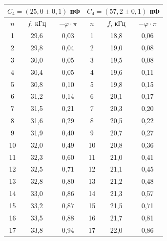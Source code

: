 \documentclass[a4paper, 12pt]{article}%
\begin{document}
\begin{center}
\begin{tabular}{ccc||c|c|c|}
\hline
\multicolumn{3}{|c||}{$C_4 = (25,0 \pm 0,1)$ нФ} & \multicolumn{3}{c|}{$C_4 = (57,2 \pm 0,1)$ нФ} \\ \hline
\multicolumn{1}{|c|}{$n$} & \multicolumn{1}{c|}{$f$, кГц} & $-\varphi\cdot \pi$ & $n$ & $f$, кГц & $-\varphi\cdot \pi$ \\ \hline
\multicolumn{1}{|c|}{1} & \multicolumn{1}{c|}{29,6} & 0,03 & 1 & 18,8 & 0,06 \\ \hline
\multicolumn{1}{|c|}{2} & \multicolumn{1}{c|}{29,8} & 0,04 & 2 & 19,0 & 0,08 \\ \hline
\multicolumn{1}{|c|}{3} & \multicolumn{1}{c|}{30,0} & 0,05 & 3 & 19,5 & 0,08 \\ \hline
\multicolumn{1}{|c|}{4} & \multicolumn{1}{c|}{30,4} & 0,05 & 4 & 19,6 & 0,11 \\ \hline
\multicolumn{1}{|c|}{5} & \multicolumn{1}{c|}{30,8} & 0,10 & 5 & 19,8 & 0,15 \\ \hline
\multicolumn{1}{|c|}{6} & \multicolumn{1}{c|}{31,2} & 0,14 & 6 & 20,1 & 0,17 \\ \hline
\multicolumn{1}{|c|}{7} & \multicolumn{1}{c|}{31,5} & 0,21 & 7 & 20,3 & 0,20 \\ \hline
\multicolumn{1}{|c|}{8} & \multicolumn{1}{c|}{31,6} & 0,29 & 8 & 20,5 & 0,22 \\ \hline
\multicolumn{1}{|c|}{9} & \multicolumn{1}{c|}{31,9} & 0,40 & 9 & 20,7 & 0,27 \\ \hline
\multicolumn{1}{|c|}{10} & \multicolumn{1}{c|}{32,0} & 0,49 & 10 & 20,8 & 0,36 \\ \hline
\multicolumn{1}{|c|}{11} & \multicolumn{1}{c|}{32,3} & 0,60 & 11 & 21,0 & 0,41 \\ \hline
\multicolumn{1}{|c|}{12} & \multicolumn{1}{c|}{32,5} & 0,71 & 12 & 21,1 & 0,45 \\ \hline
\multicolumn{1}{|c|}{13} & \multicolumn{1}{c|}{32,8} & 0,80 & 13 & 21,2 & 0,48 \\ \hline
\multicolumn{1}{|c|}{14} & \multicolumn{1}{c|}{33,0} & 0,86 & 14 & 21,3 & 0,57 \\ \hline
\multicolumn{1}{|c|}{15} & \multicolumn{1}{c|}{33,2} & 0,87 & 15 & 21,5 & 0,71 \\ \hline
\multicolumn{1}{|c|}{16} & \multicolumn{1}{c|}{33,5} & 0,88 & 16 & 21,7 & 0,81 \\ \hline
\multicolumn{1}{|c|}{17} & \multicolumn{1}{c|}{33,8} & 0,94 & 17 & 22,0 & 0,86 \\ \hline

\end{tabular}
\end{center}
\end{document}

